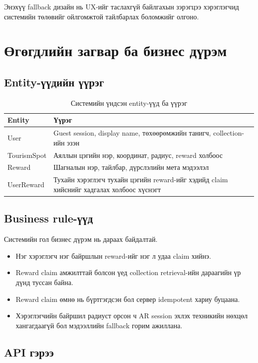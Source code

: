 \begin{sloppy}
Энэхүү fallback дизайн нь UX-ийг таслахгүй байлгахын зэрэгцээ хэрэглэгчид системийн төлөвийг ойлгомжтой тайлбарлах боломжийг олгоно.

\section{Өгөгдлийн загвар ба бизнес дүрэм}

\subsection{Entity-үүдийн үүрэг}

\begin{table}[H]
\centering
\caption{Системийн үндсэн entity-үүд ба үүрэг}
\begin{tabular}{|p{3cm}|p{9cm}|}
\hline
\textbf{Entity} & \textbf{Үүрэг} \\ \hline
User & Guest session, display name, төхөөрөмжийн танигч, collection-ийн эзэн \\ \hline
TourismSpot & Аяллын цэгийн нэр, координат, радиус, reward холбоос \\ \hline
Reward & Шагналын нэр, тайлбар, дүрслэлийн мета мэдээлэл \\ \hline
UserReward & Тухайн хэрэглэгч тухайн цэгийн reward-ийг хэдийд claim хийснийг хадгалах холбоос хүснэгт \\ \hline
\end{tabular}
\end{table}

\subsection{Business rule-үүд}

Системийн гол бизнес дүрэм нь дараах байдалтай.

\begin{itemize}
    \item Нэг хэрэглэгч нэг байршлын reward-ийг нэг л удаа claim хийнэ.
    \item Reward claim амжилттай болсон үед collection retrieval-ийн дараагийн үр дүнд туссан байна.
    \item Reward claim өмнө нь бүртгэгдсэн бол сервер idempotent хариу буцаана.
    \item Хэрэглэгчийн байршил радиуст орсон ч AR session эхлэх техникийн нөхцөл хангагдаагүй бол мэдээллийн fallback горим ажиллана.
\end{itemize}

\subsection{API гэрээ}


\end{sloppy}
